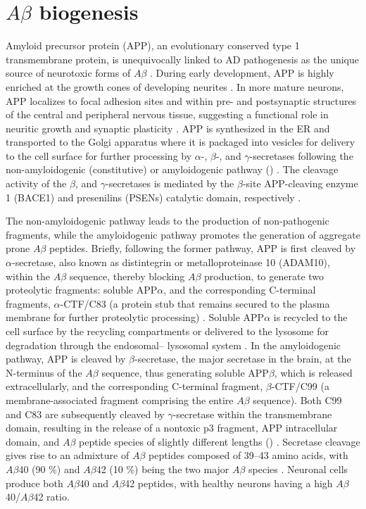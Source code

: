 \section{$A\beta$ biogenesis}
Amyloid precursor protein (APP), an evolutionary conserved type 1 transmembrane protein, is unequivocally linked to AD pathogenesis as the unique source of neurotoxic forms of $A\beta$ \citep{Chen2015,Rajendran2012}. During early development, APP is highly enriched at the growth cones of developing neurites \citep{Ramaker2016,Sabo2003}. In more mature neurons, APP localizes to focal adhesion sites and within pre- and postsynaptic structures of the central and peripheral nervous tissue, suggesting a functional role in neuritic growth and synaptic plasticity \citep{Ashley2005,Yamazaki1997}. APP is synthesized in the ER and transported to the Golgi apparatus where it is packaged into vesicles for delivery to the cell surface for further processing by $\alpha$-, $\beta$-, and $\gamma$-secretases following the non-amyloidogenic (constitutive) or amyloidogenic pathway () \citep{Obrien2011,Ramaker2016}. The cleavage activity of the $\beta$, and $\gamma$-secretases is mediated by the  $\beta$-site APP-cleaving enzyme 1 (BACE1) and presenilins (PSENs) catalytic domain, respectively \citep{Rajendran2012}. 

The non-amyloidogenic pathway leads to the production of non-pathogenic fragments, while the amyloidogenic pathway promotes the generation of aggregate prone $A\beta$ peptides. Briefly, following the former pathway, APP is first cleaved by $\alpha$-secretase, also known as distintegrin or metalloproteinase 10 (ADAM10), within the $A\beta$ sequence, thereby blocking $A\beta$ production, to generate two proteolytic fragments: soluble APP$\alpha$, and the corresponding C-terminal fragments, $\alpha$-CTF/C83 (a protein stub that remains secured to the plasma membrane for further proteolytic processing) \citep{Gandy1994,Roychaudhuri2009}. Soluble APP$\alpha$ is recycled to the cell surface by the recycling compartments or delivered to the lysosome for degradation through the endosomal– lysosomal system \citep{Caster2013,Golde1992}. In the amyloidogenic pathway, APP is cleaved by $\beta$-secretase, the major secretase in the brain, at the N-terminus of the $A\beta$ sequence, thus generating soluble APP$\beta$, which is released extracellularly, and the corresponding C-terminal fragment, $\beta$-CTF/C99 (a membrane-associated fragment comprising the entire $A\beta$ sequence). Both C99 and C83 are subsequently cleaved by $\gamma$-secretase within the transmembrane domain, resulting in the release of a nontoxic p3 fragment, APP intracellular domain, and $A\beta$ peptide species of slightly different lengths () \citep{Cole2007,Jarrett1993}. Secretase cleavage gives rise to an admixture of $A\beta$ peptides composed of 39–43 amino acids, with $A\beta$40 (90 \%) and $A\beta$42 (10 \%) being the two major $A\beta$ species \citep{Gouras2000,Takahasi2013}. Neuronal cells produce both $A\beta$40 and $A\beta$42 peptides, with healthy neurons having a high $A\beta$40/$A\beta$42 ratio.

